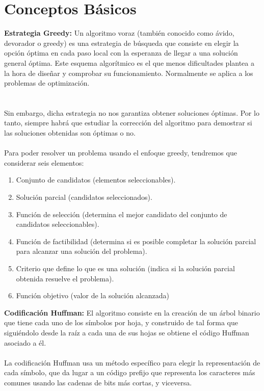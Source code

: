 \documentclass[12pt,twoside]{article}
\begin{document}
\section{Conceptos B\'asicos}
{\bf Estrategia Greedy:} Un algoritmo voraz (también conocido como \'avido, devorador o greedy) es una estrategia de b\'usqueda que consiste en elegir la opción óptima en cada paso local con la esperanza de llegar a una solución general óptima. Este esquema algorítmico es el que menos dificultades plantea a la hora de diseñar y comprobar su funcionamiento. Normalmente se aplica a los problemas de optimizaci\'on.\\\\\\ 
Sin embargo, dicha estrategia  no nos garantiza obtener soluciones óptimas. Por lo tanto, siempre habr\'a que estudiar la correcci\'on del algoritmo para demostrar si las soluciones obtenidas son \'optimas o no.\\\\
Para poder resolver un problema usando el enfoque greedy, tendremos que considerar seis elementos:\\
\begin{enumerate}  
\item Conjunto de candidatos (elementos seleccionables).
\item Soluci\'on parcial (candidatos seleccionados).
\item Funci\'on de selecci\'on (determina el mejor candidato del conjunto de candidatos seleccionables).
\item Funci\'on de factibilidad (determina si es posible completar la soluci\'on parcial para alcanzar una soluci\'on del problema).
\item Criterio que define lo que es una soluci\'on (indica si la soluci\'on parcial obtenida resuelve el problema).
\item Funci\'on objetivo (valor de la soluci\'on alcanzada)
\end{enumerate}
{\bf Codificaci\'on Huffman:} El algoritmo consiste en la creación de un \'arbol binario que tiene cada uno de los s\'imbolos por hoja, y construido de tal forma que sigui\'endolo desde la ra\'iz a cada una de sus hojas se obtiene el c\'odigo Huffman asociado a \'el.\\\\
La codificaci\'on Huffman usa un m\'etodo específico para elegir la representaci\'on de cada s\'imbolo, que da lugar a un c\'odigo prefijo que representa los caracteres m\'as comunes usando las cadenas de bits m\'as cortas, y viceversa.\\\\
\end{document}
